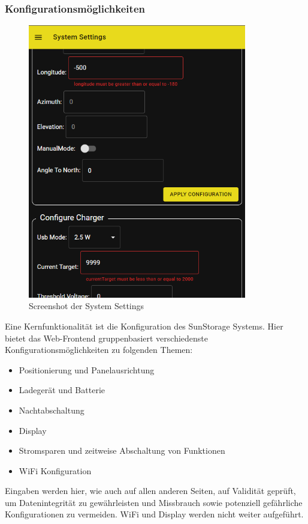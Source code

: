 \subsubsection{Konfigurationsmöglichkeiten}

\begin{figure}[htpb] %
    \centering
    \includegraphics[height=12cm,width=\textwidth,keepaspectratio=true]{pics/Screenshot_SystemSettings.png}
    \caption{Screenshot der System Settings}
\end{figure}

Eine Kernfunktionalität ist die Konfiguration des SunStorage Systems. Hier bietet das Web-Frontend gruppenbasiert verschiedenste Konfigurationsmöglichkeiten zu folgenden Themen:
\begin{itemize}
    \item Positionierung und Panelausrichtung
    \item Ladegerät und Batterie
    \item Nachtabschaltung
    \item Display
    \item Stromsparen und zeitweise Abschaltung von Funktionen
    \item WiFi Konfiguration
\end{itemize}

Eingaben werden hier, wie auch auf allen anderen Seiten, auf Validität geprüft, um Datenintegrität zu gewährleisten und Missbrauch sowie potenziell gefährliche Konfigurationen zu vermeiden.
WiFi und Display werden nicht weiter aufgeführt.

